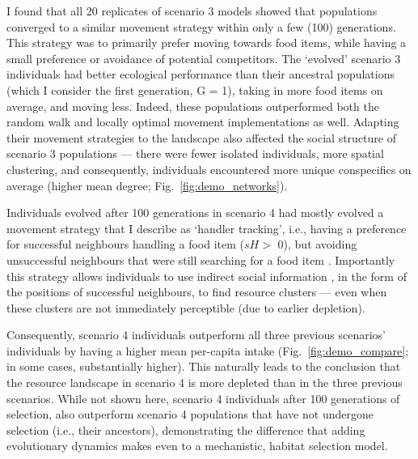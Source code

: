 \begin{interludeenv}
I found that all 20 replicates of scenario 3 models showed that populations converged to a similar movement strategy within only a few (100) generations.
This strategy was to primarily prefer moving towards food items, while having a small preference or avoidance of potential competitors.
The `evolved' scenario 3 individuals had better ecological performance than their ancestral populations (which I consider the first generation, G = 1), taking in more food items on average, and moving less.
Indeed, these populations outperformed both the random walk and locally optimal movement implementations as well.
Adapting their movement strategies to the landscape also affected the social structure of scenario 3 populations --- there were fewer isolated individuals, more spatial clustering, and consequently, individuals encountered more unique conspecifics on average (higher mean degree; Fig.~\ref{fig:demo_networks}).

Individuals evolved after 100 generations in scenario 4 had mostly evolved a movement strategy that I describe as `handler tracking', i.e., having a preference for successful neighbours handling a food item ($sH >$ 0), but avoiding unsuccessful neighbours that were still searching for a food item \citep[$sN <$ 0;][]{gupte2021a,gupte2022c}.
Importantly this strategy allows individuals to use indirect social information \citep{dall2005,spiegel2016a}, in the form of the positions of successful neighbours, to find resource clusters --- even when these clusters are not immediately perceptible (due to earlier depletion).

Consequently, scenario 4 individuals outperform all three previous scenarios' individuals by having a higher mean per-capita intake (Fig.~\ref{fig:demo_compare}; in some cases, substantially higher).
This naturally leads to the conclusion that the resource landscape in scenario 4 is more depleted than in the three previous scenarios.
While not shown here, scenario 4 individuals after 100 generations of selection, also outperform scenario 4 populations that have not undergone selection (i.e., their ancestors), demonstrating the difference that adding evolutionary dynamics makes even to a mechanistic, habitat selection model.


\end{interludeenv}
